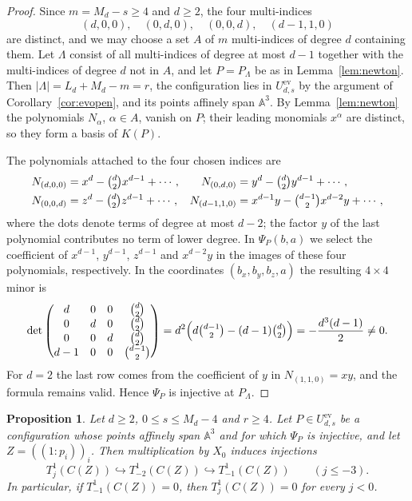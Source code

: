 \documentclass{amsart}
\newtheorem{proposition}[theorem]{Proposition}
\theoremstyle{definition}
\theoremstyle{remark}
\numberwithin{equation}{section}
\newcommand{\A}{\mathbb{A}}
\begin{document}
\begin{proof}
Since $m=M_d-s\ge4$ and $d\ge2$, the four multi-indices
\[
  (d,0,0),\quad(0,d,0),\quad(0,0,d),\quad(d-1,1,0)
\]
are distinct, and we may choose a set $A$ of $m$ multi-indices of degree $d$ containing
them. Let $\Lambda$ consist of all multi-indices of degree at most $d-1$ together with
the multi-indices of degree $d$ not in $A$, and let $P=P_\Lambda$ be as in
Lemma~\ref{lem:newton}. Then $|\Lambda|=L_d+M_d-m=r$, the configuration lies in
$U^{\mathrm{ev}}_{d,s}$ by the argument of Corollary~\ref{cor:evopen}, and its points
affinely span $\A^3$. By Lemma~\ref{lem:newton} the polynomials $N_\alpha$,
$\alpha\in A$, vanish on $P$; their leading monomials $x^\alpha$ are distinct, so they
form a basis of $K(P)$.

The polynomials attached to the four chosen indices are
\begin{align*}
  N_{(d,0,0)}&=x^d-\tbinom d2x^{d-1}+\cdots, &
  N_{(0,d,0)}&=y^d-\tbinom d2y^{d-1}+\cdots,\\
  N_{(0,0,d)}&=z^d-\tbinom d2z^{d-1}+\cdots, &
  N_{(d-1,1,0)}&=x^{d-1}y-\tbinom{d-1}2x^{d-2}y+\cdots,
\end{align*}
where the dots denote terms of degree at most $d-2$; the factor $y$ of the last
polynomial contributes no term of lower degree. In $\Psi_P(b,a)$ we select the
coefficient of $x^{d-1}$, $y^{d-1}$, $z^{d-1}$ and $x^{d-2}y$ in the images of these
four polynomials, respectively. In the coordinates $(b_x,b_y,b_z,a)$ the resulting
$4\times4$ minor is
\[
  \det\begin{pmatrix}
    d&0&0&\binom d2\\
    0&d&0&\binom d2\\
    0&0&d&\binom d2\\
    d-1&0&0&\binom{d-1}2
  \end{pmatrix}
  =d^2\Bigl(d\tbinom{d-1}2-(d-1)\tbinom d2\Bigr)
  =-\frac{d^3(d-1)}2\ne0 .
\]
For $d=2$ the last row comes from the coefficient of $y$ in $N_{(1,1,0)}=xy$, and the
formula remains valid. Hence $\Psi_P$ is injective at $P_\Lambda$.
\end{proof}

\begin{proposition}\label{prop:lowerneg}
Let $d\ge2$, $0\le s\le M_d-4$ and $r\ge4$. Let $P\in U^{\mathrm{ev}}_{d,s}$ be a
configuration whose points affinely span $\A^3$ and for which $\Psi_P$ is injective,
and let $Z=((1:p_i))_i$. Then multiplication by $X_0$ induces injections
\[
  T^1_j(C(Z))\hookrightarrow T^1_{-2}(C(Z))\hookrightarrow T^1_{-1}(C(Z))
  \qquad(j\le-3).
\]
In particular, if $T^1_{-1}(C(Z))=0$, then $T^1_j(C(Z))=0$ for every $j<0$.
\end{proposition}
\end{document}
